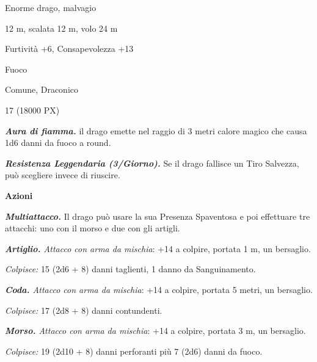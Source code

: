 \begin{multicols}{2}
{
\begin{description}[noitemsep, topsep=0pt, parsep=0pt, partopsep=0pt, itemsep=1pt, leftmargin=2.35cm,  labelwidth=2.2cm, itemindent=0cm, listparindent=0pt] %
\setlength{\baselineskip}{10pt}
\item[\textbf{Taglia/Tipo}] Enorme drago, malvagio
\item[\textbf{Caratt.}] 
\item[\textbf{Punti Ferita}] 
\item[\textbf{Movimento}] 12 m, scalata 12 m, volo 24 m
\item[\textbf{Tiri Salvez.}] 
\item[\textbf{Comp.}] Furtività +6, Consapevolezza +13
\item[\textbf{Imm. Danni}] Fuoco
\item[\textbf{Sensi}] 
\item[\textbf{Linguaggi}] Comune, Draconico
\item[\textbf{Sfida}] 17 (18000 PX)
\end{description}
\smallskip

\emph{\textbf{Aura di fiamma.}} il drago emette nel raggio di 3 metri calore magico che causa 1d6 danni da fuoco a round.

\emph{\textbf{Resistenza Leggendaria (3/Giorno).}} Se il drago fallisce un Tiro Salvezza, può scegliere invece di riuscire.

\textbf{Azioni}

\emph{\textbf{Multiattacco.}} Il drago può usare la sua Presenza Spaventosa e poi effettuare tre attacchi: uno con il morso e due con gli artigli.

\emph{\textbf{Artiglio.} Attacco con arma da mischia}: +14 a colpire, portata 1 m, un bersaglio.

\emph{Colpisce:} 15 (2d6 + 8) danni taglienti, 1 danno da Sanguinamento.

\emph{\textbf{Coda.} Attacco con arma da mischia}: +14 a colpire, portata 5 metri, un bersaglio.

\emph{Colpisce:} 17 (2d8 + 8) danni contundenti.

\emph{\textbf{Morso.} Attacco con arma da mischia}: +14 a colpire, portata 3 m, un bersaglio.

\emph{Colpisce:} 19 (2d10 + 8) danni perforanti più 7 (2d6) danni da fuoco.

}
\end{multicols}
